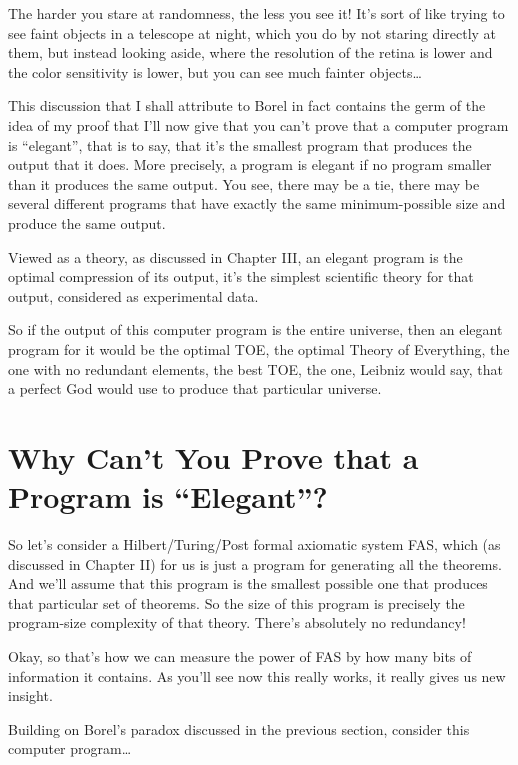 \documentclass[12pt]{book}
\begin{document}
The harder you stare at randomness, the less you see it!  
It's sort of like trying to see faint objects
in a telescope at night, 
which you do by not staring directly at them, but instead looking aside, where the
resolution of the retina is lower and the color sensitivity is lower, but you can see
much fainter objects\ldots
 
This discussion that I shall attribute to Borel in fact contains the germ of the idea of my proof
that I'll now give that you can't prove that a computer program is ``elegant'', that
is to say, that it's the smallest program that produces the output that it does.  More precisely,
a program is elegant if no program smaller than it produces the same output.  You see,
there may be a tie, there may be several different programs that have exactly the same
minimum-possible size and produce the same output.
 
Viewed as a theory, as discussed in Chapter III, an elegant program is the optimal
compression of its output, it's the simplest scientific theory for that output, considered
as experimental data. 
 
So if the output of this computer program is the entire universe, then an elegant program
for it would be the optimal TOE, the optimal Theory of Everything, the one with no redundant elements,
the best TOE, the one, Leibniz would say, that a perfect God would use to produce that particular
universe.

\section*{Why Can't You Prove that a Program is ``Elegant''?}

So let's consider a Hilbert/Turing/Post formal axiomatic system FAS, which (as discussed in
Chapter II) for us
is just a program for generating all the theorems.  And we'll assume that this program
is the smallest possible one that produces that particular set of theorems.  So the size of this
program is precisely the program-size complexity of that theory. There's absolutely no redundancy!
 
Okay, so that's how we
can measure the power of FAS by how many bits of information it contains. As you'll see
now this really works, it really gives us new insight.
 
Building on Borel's paradox discussed in the previous section, consider this 
computer program\ldots
 
\end{document}
